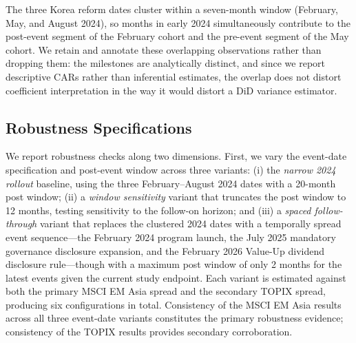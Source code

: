 The three Korea reform dates cluster within a seven-month window (February, May, and August 2024), so months in early 2024 simultaneously contribute to the post-event segment of the February cohort and the pre-event segment of the May cohort. We retain and annotate these overlapping observations rather than dropping them: the milestones are analytically distinct, and since we report descriptive CARs rather than inferential estimates, the overlap does not distort coefficient interpretation in the way it would distort a DiD variance estimator.

\subsection{Robustness Specifications}

We report robustness checks along two dimensions. First, we vary the event-date specification and post-event window across three variants: (i) the \textit{narrow 2024 rollout} baseline, using the three February--August 2024 dates with a 20-month post window; (ii) a \textit{window sensitivity} variant that truncates the post window to 12 months, testing sensitivity to the follow-on horizon; and (iii) a \textit{spaced follow-through} variant that replaces the clustered 2024 dates with a temporally spread event sequence---the February 2024 program launch, the July 2025 mandatory governance disclosure expansion, and the February 2026 Value-Up dividend disclosure rule---though with a maximum post window of only 2 months for the latest events given the current study endpoint. Each variant is estimated against both the primary MSCI EM Asia spread and the secondary TOPIX spread, producing six configurations in total. Consistency of the MSCI EM Asia results across all three event-date variants constitutes the primary robustness evidence; consistency of the TOPIX results provides secondary corroboration.


